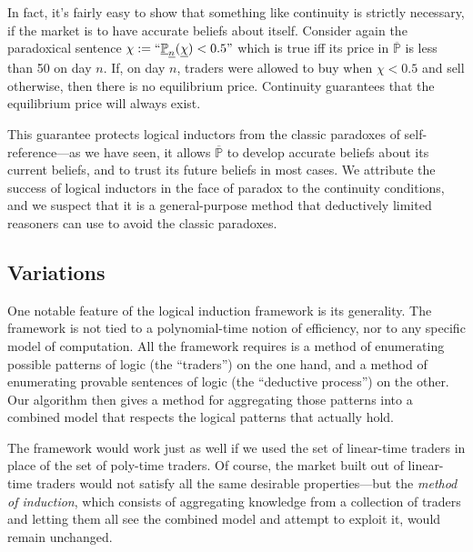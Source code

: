 \documentclass[authordate,onecolumn,noenvironments]{miri-tech-article}
\numberwithin{equation}{subsection}
\newcommand{\quot}[1]{``#1"}
\newcommand{\enc}[1]{{\underline{#1}}}
\newcommand{\seq}[1]{{\overline{#1}}}
\newcommand{\nn}{n}
\newcommand{\BelState}{\mathbb{P}}
\newcommand{\pt}{\BelState}
\newcommand{\MP}{\seq{\pt}}
\begin{document}
In fact, it's fairly easy to show that something like continuity is strictly necessary, if the market is to have accurate beliefs about itself. Consider again the paradoxical sentence $\chi := \quot{\enc{\pt}_{\enc{\nn}}(\enc{\chi}) < 0.5}$ which is true iff its price in $\MP$ is less than 50\textcent{} on day $\nn$. If, on day $\nn$, traders were allowed to buy when $\chi < 0.5$ and sell otherwise, then there is no equilibrium price. Continuity guarantees that the equilibrium price will always exist.

This guarantee protects logical inductors from the classic paradoxes of self-reference---as we have seen, it allows $\MP$ to develop accurate beliefs about its current beliefs, and to trust its future beliefs in most cases. We attribute the success of logical inductors in the face of paradox to the continuity conditions, and we suspect that it is a general-purpose method that deductively limited reasoners can use to avoid the classic paradoxes.

%
%
%
%
%
%
%
%
%
%
%
%
%
%
%
%
%
\subsection{Variations}\label{sec:variations}

One notable feature of the logical induction framework is its generality. The framework is not tied to a polynomial-time notion of efficiency, nor to any specific model of computation. All the framework requires is a method of enumerating possible patterns of logic (the ``traders'') on the one hand, and a method of enumerating provable sentences of logic (the ``deductive process'') on the other. Our algorithm then gives a method for aggregating those patterns into a combined model that respects the logical patterns that actually hold.

The framework would work just as well if we used the set of linear-time traders in place of the set of poly-time traders. Of course, the market built out of linear-time traders would not satisfy all the same desirable properties---but the \emph{method of induction}, which consists of aggregating knowledge from a collection of traders and letting them all see the combined model and attempt to exploit it, would remain unchanged.
\end{document}
